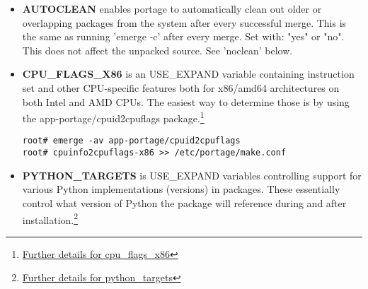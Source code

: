 \documentclass[10pt,a4paper]{article}
\begin{document}
\begin{enumerate}
\begin{enumerate}[label*=\arabic*.]
\begin{itemize}
\begin{itemize}[label={o}]
					\item \textbf{sandbox} option: Enable sandbox-ing when running emerge(1) and ebuild(1).
					
					\item \textbf{ebuild-locks} option: Use locks to ensure that unsandboxed ebuild phases never execute concurrently. Also see parallel-install.
					
					\item \textbf{strict} option: Have portage react strongly to conditions that have the potential to be dangerous (like missing or incorrect digests for ebuilds).
					
					\item \textbf{unmerge-orphans} option: If a file is not claimed by another package in the same slot and it is not protected by CONFIG\_PROTECT, unmerge it even if the modification time or checksum differs from the file that was originally installed. 
					
				\end{itemize}
				
				\item \textbf{AUTOCLEAN} enables portage to automatically clean out older or overlapping packages from the system after every successful merge. This is the same as running 'emerge -c' after every merge. Set with: "yes" or "no". This does not affect the unpacked source. See 'noclean' below.
				
				
				
				\item \textbf{CPU\_FLAGS\_X86} is an USE\_EXPAND variable containing instruction set and other CPU-specific features both for x86/amd64 architectures on both Intel and AMD CPUs. The easiest way to determine those is by using the app-portage/cpuid2cpuflags package.\footnote{\href{https://wiki.gentoo.org/wiki/CPU_FLAGS_X86}{Further details for cpu\_flags\_x86}}
				
				\begin{lstlisting}[style=BashInputRoot]					
root# emerge -av app-portage/cpuid2cpuflags
root# cpuinfo2cpuflags-x86 >> /etc/portage/make.conf
				\end{lstlisting}
				
				
				
				\item \textbf{PYTHON\_TARGETS} is USE\_EXPAND variables controlling support for various Python implementations (versions) in packages. These essentially control what version of Python the package will reference during and after installation.\footnote{\href{https://wiki.gentoo.org/wiki/Project:Python/PYTHON_TARGETS}{Further details for python\_targets}}
				

\end{itemize}
\end{enumerate}
\end{enumerate}
\end{document}
